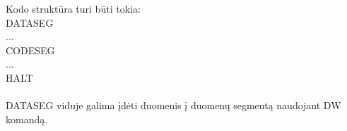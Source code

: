 	Kodo struktūra turi būti tokia:\\
	DATASEG\\
	...\\
	CODESEG\\
	...\\
	HALT\\
	\\
	DATASEG viduje galima įdėti duomenis į duomenų segmentą naudojant DW komandą.
\clearpage